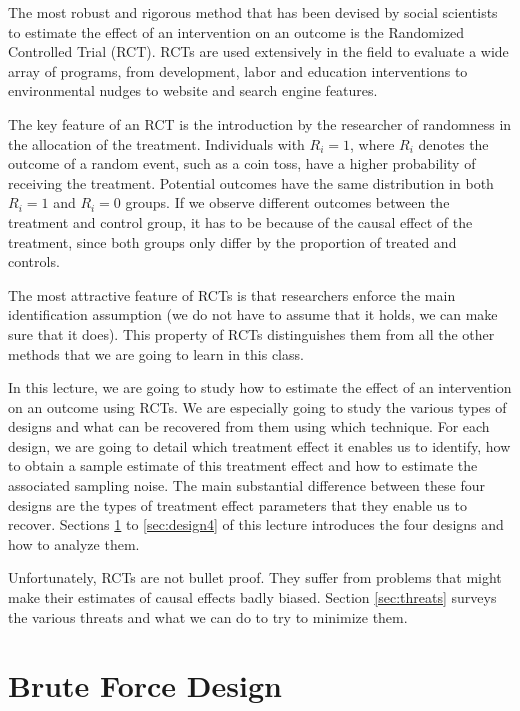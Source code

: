\documentclass[]{book}
\theoremstyle{definition}
\theoremstyle{definition}
\theoremstyle{definition}
\theoremstyle{remark}
\begin{document}
The most robust and rigorous method that has been devised by social scientists to estimate the effect of an intervention on an outcome is the Randomized Controlled Trial (RCT).
RCTs are used extensively in the field to evaluate a wide array of programs, from development, labor and education interventions to environmental nudges to website and search engine features.

The key feature of an RCT is the introduction by the researcher of randomness in the allocation of the treatment.
Individuals with \(R_i=1\), where \(R_i\) denotes the outcome of a random event, such as a coin toss, have a higher probability of receiving the treatment.
Potential outcomes have the same distribution in both \(R_i=1\) and \(R_i=0\) groups.
If we observe different outcomes between the treatment and control group, it has to be because of the causal effect of the treatment, since both groups only differ by the proportion of treated and controls.

The most attractive feature of RCTs is that researchers enforce the main identification assumption (we do not have to assume that it holds, we can make sure that it does).
This property of RCTs distinguishes them from all the other methods that we are going to learn in this class.

In this lecture, we are going to study how to estimate the effect of an intervention on an outcome using RCTs.
We are especially going to study the various types of designs and what can be recovered from them using which technique.
For each design, we are going to detail which treatment effect it enables us to identify, how to obtain a sample estimate of this treatment effect and how to estimate the associated sampling noise.
The main substantial difference between these four designs are the types of treatment effect parameters that they enable us to recover.
Sections \ref{sec:design1} to \ref{sec:design4} of this lecture introduces the four designs and how to analyze them.

Unfortunately, RCTs are not bullet proof.
They suffer from problems that might make their estimates of causal effects badly biased.
Section \ref{sec:threats} surveys the various threats and what we can do to try to minimize them.

\hypertarget{sec:design1}{%
\section{Brute Force Design}\label{sec:design1}}
\end{document}
